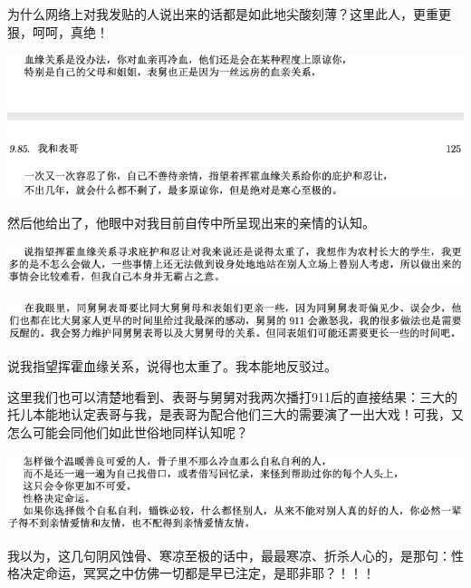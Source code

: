 \documentclass[9pt, b5paper]{article}
\begin{document}
为什么网络上对我发贴的人说出来的话都是如此地尖酸刻薄？这里此人，更重更狠，呵呵，真绝！

\begin{center}
\includegraphics[width=.9\linewidth]{./pic/backups_plans_20210413_131357.png}
\end{center}

然后他给出了，他眼中对我目前自传中所呈现出来的亲情的认知。

\begin{center}
\includegraphics[width=.9\linewidth]{./pic/backups_plans_20210413_143417.png}
\end{center}

\begin{center}
\includegraphics[width=.9\linewidth]{./pic/backups_plans_20210413_143433.png}
\end{center}

说我指望挥霍血缘关系，说得也太重了。我本能地反驳过。 

这里我们也可以清楚地看到、表哥与舅舅对我两次播打911后的直接结果：三大的托儿本能地认定表哥与我，是表哥为配合他们三大的需要演了一出大戏！可我，又怎么可能会同他们如此世俗地同样认知呢？

\begin{center}
\includegraphics[width=.9\linewidth]{./pic/backups_plans_20210413_131623.png}
\end{center}

我以为，这几句阴风蚀骨、寒凉至极的话中，最最寒凉、折杀人心的，是那句：性格决定命运，冥冥之中仿佛一切都是早已注定，是耶非耶？！！！
\end{document}
